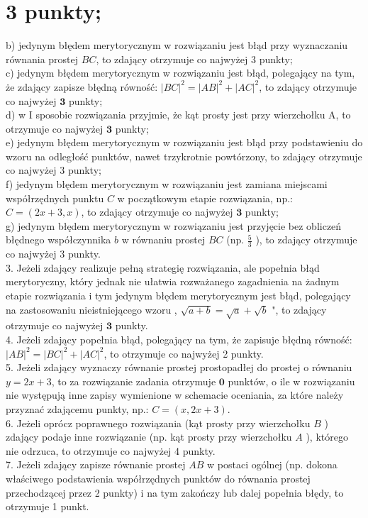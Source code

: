 \documentclass[10pt]{article}
\begin{document}
\section*{3 punkty;}
b) jedynym błędem merytorycznym w rozwiązaniu jest błąd przy wyznaczaniu równania prostej $B C$, to zdający otrzymuje co najwyżej 3 punkty;\\
c) jedynym błędem merytorycznym w rozwiązaniu jest błąd, polegający na tym, że zdający zapisze błędną równość: $|B C|^{2}=|A B|^{2}+|A C|^{2}$, to zdający otrzymuje co najwyżej $\mathbf{3}$ punkty;\\
d) w I sposobie rozwiązania przyjmie, że kąt prosty jest przy wierzchołku A, to otrzymuje co najwyżej $\mathbf{3}$ punkty;\\
e) jedynym błędem merytorycznym w rozwiązaniu jest błąd przy podstawieniu do wzoru na odległość punktów, nawet trzykrotnie powtórzony, to zdający otrzymuje co najwyżej 3 punkty;\\
f) jedynym błędem merytorycznym w rozwiązaniu jest zamiana miejscami współrzędnych punktu $C$ w początkowym etapie rozwiązania, np.: $C=(2 x+3, x)$, to zdający otrzymuje co najwyżej $\mathbf{3}$ punkty;\\
g) jedynym błędem merytorycznym w rozwiązaniu jest przyjęcie bez obliczeń błędnego współczynnika $b$ w równaniu prostej $B C$ (np. $\frac{5}{3}$ ), to zdający otrzymuje co najwyżej 3 punkty.\\
3. Jeżeli zdający realizuje pełną strategię rozwiązania, ale popełnia błąd merytoryczny, który jednak nie ułatwia rozważanego zagadnienia na żadnym etapie rozwiązania i tym jedynym błędem merytorycznym jest błąd, polegający na zastosowaniu nieistniejącego wzoru , $\sqrt{a+b}=\sqrt{a}+\sqrt{b}$ ", to zdający otrzymuje co najwyżej $\mathbf{3}$ punkty.\\
4. Jeżeli zdający popełnia błąd, polegający na tym, że zapisuje błędną równość: $|A B|^{2}=|B C|^{2}+|A C|^{2}$, to otrzymuje co najwyżej 2 punkty.\\
5. Jeżeli zdający wyznaczy równanie prostej prostopadłej do prostej o równaniu $y=2 x+3$, to za rozwiązanie zadania otrzymuje $\mathbf{0}$ punktów, o ile w rozwiązaniu nie występują inne zapisy wymienione w schemacie oceniania, za które należy przyznać zdającemu punkty, np.: $C=(x, 2 x+3)$.\\
6. Jeżeli oprócz poprawnego rozwiązania (kąt prosty przy wierzchołku $B$ ) zdający podaje inne rozwiązanie (np. kąt prosty przy wierzchołku $A$ ), którego nie odrzuca, to otrzymuje co najwyżej 4 punkty.\\
7. Jeżeli zdający zapisze równanie prostej $A B$ w postaci ogólnej (np. dokona właściwego podstawienia współrzędnych punktów do równania prostej przechodzącej przez 2 punkty) i na tym zakończy lub dalej popełnia błędy, to otrzymuje 1 punkt.
\end{document}
